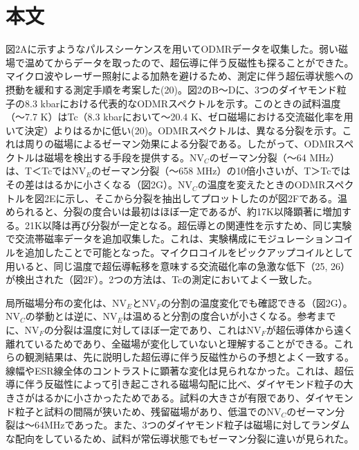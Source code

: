 \documentclass[dvipdfmx]{jsarticle}
\begin{document}
\section{本文}

図2Aに示すようなパルスシーケンスを用いてODMRデータを収集した。弱い磁場で温めてからデータを取ったので、超伝導に伴う反磁性も探ることができた。マイクロ波やレーザー照射による加熱を避けるため、測定に伴う超伝導状態への摂動を緩和する測定手順を考案した(20)。図2のB～Dに、3つのダイヤモンド粒子の8.3 kbarにおける代表的なODMRスペクトルを示す。このときの試料温度（～7.7 K）はTc（8.3 kbarにおいて～20.4 K、ゼロ磁場における交流磁化率を用いて決定）よりはるかに低い(20)。ODMRスペクトルは、異なる分裂を示す。これは周りの磁場によるゼーマン効果による分裂である。したがって、ODMRスペクトルは磁場を検出する手段を提供する。NV$_C$のゼーマン分裂（～64 MHz）は、T＜TcではNV$_E$のゼーマン分裂（～658 MHz）の10倍小さいが、T＞Tcではその差ははるかに小さくなる（図2G）。NV$_C$の温度を変えたときのODMRスペクトルを図2Eに示し、そこから分裂を抽出してプロットしたのが図2Fである。温められると、分裂の度合いは最初はほぼ一定であるが、約17K以降顕著に増加する。21K以降は再び分裂が一定となる。超伝導との関連性を示すため、同じ実験で交流帯磁率データを追加収集した。これは、実験構成にモジュレーションコイルを追加したことで可能となった。マイクロコイルをピックアップコイルとして用いると、同じ温度で超伝導転移を意味する交流磁化率の急激な低下（25, 26）が検出された（図2F）。2つの方法は、Tcの測定においてよく一致した。

局所磁場分布の変化は、NV$_E$とNV$_F$の分割の温度変化でも確認できる（図2G）。NV$_C$の挙動とは逆に、NV$_E$は温めると分割の度合いが小さくなる。参考までに、NV$_F$の分裂は温度に対してほぼ一定であり、これはNV$_F$が超伝導体から遠く離れているためであり、全磁場が変化していないと理解することができる。これらの観測結果は、先に説明した超伝導に伴う反磁性からの予想とよく一致する。線幅やESR線全体のコントラストに顕著な変化は見られなかった。これは、超伝導に伴う反磁性によって引き起こされる磁場勾配に比べ、ダイヤモンド粒子の大きさがはるかに小さかったためである。試料の大きさが有限であり、ダイヤモンド粒子と試料の間隔が狭いため、残留磁場があり、低温でのNV$_C$のゼーマン分裂は〜64MHzであった。また、3つのダイヤモンド粒子は磁場に対してランダムな配向をしているため、試料が常伝導状態でもゼーマン分裂に違いが見られた。
\end{document}
